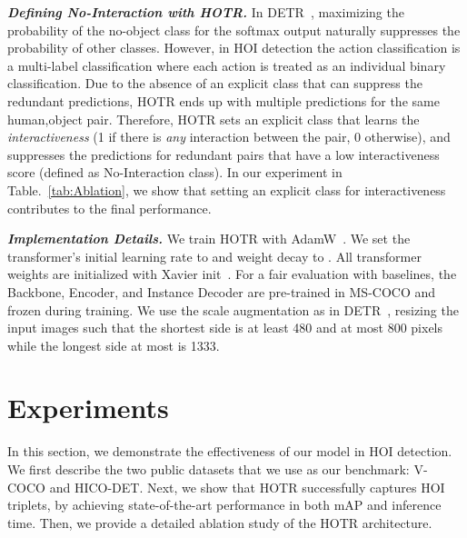 \documentclass[final]{cvpr}
\begin{document}
\noindent\textit{\textbf{Defining No-Interaction with HOTR.}}
In DETR~\cite{carion2020end}, maximizing the probability of the no-object class for the softmax output naturally suppresses the probability of other classes.
However, in HOI detection the action classification is a multi-label classification where each action is treated as an individual binary classification.
Due to the absence of an explicit class that can suppress the redundant predictions, HOTR ends up with multiple predictions for the same human,object pair.
Therefore, HOTR sets an explicit class that learns the \textit{interactiveness} (1 if there is \textit{any} interaction between the pair, 0 otherwise), and suppresses the predictions for redundant pairs that have a low interactiveness score (defined as No-Interaction class).
In our experiment in Table.~\ref{tab:Ablation}, we show that setting an explicit class for interactiveness contributes to the final performance.
\newline

\noindent\textit{\textbf{Implementation Details.}}
We train HOTR with AdamW~\cite{loshchilov2017decoupled}.
We set the transformer's initial learning rate to  and weight decay to .
All transformer weights are initialized with Xavier init~\cite{glorot2010understanding}.
For a fair evaluation with baselines, the Backbone, Encoder, and Instance Decoder are pre-trained in MS-COCO and frozen during training.
We use the scale augmentation as in DETR~\cite{carion2020end}, resizing the input images such that the shortest side is at least 480 and at most 800 pixels while the longest side at most is 1333.
\newline  \section{Experiments}
\label{sec:experiments}
In this section, we demonstrate the effectiveness of our model in HOI detection.
We first describe the two public datasets that we use as our benchmark: V-COCO and HICO-DET. 
Next, we show that HOTR successfully captures HOI triplets, by achieving state-of-the-art performance in both mAP and inference time.
Then, we provide a detailed ablation study of the HOTR architecture.
\end{document}
